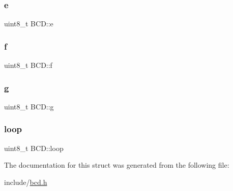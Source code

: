 \mbox{\label{structBCD_ac48c12d16a3111700c6a67f46db7ea1f}} 
\subsubsection{\texorpdfstring{e}{e}}
{\footnotesize\ttfamily uint8\+\_\+t B\+C\+D\+::e}

\mbox{\label{structBCD_abd6ad9ecd210b3f8d15a269526534a10}} 
\subsubsection{\texorpdfstring{f}{f}}
{\footnotesize\ttfamily uint8\+\_\+t B\+C\+D\+::f}

\mbox{\label{structBCD_a84dac73393cccf960f31340c034aee2e}} 
\subsubsection{\texorpdfstring{g}{g}}
{\footnotesize\ttfamily uint8\+\_\+t B\+C\+D\+::g}

\mbox{\label{structBCD_a6daf4f1f982e97a20852eedd79f4d619}} 
\subsubsection{\texorpdfstring{loop}{loop}}
{\footnotesize\ttfamily uint8\+\_\+t B\+C\+D\+::loop}



The documentation for this struct was generated from the following file\+:\begin{DoxyCompactItemize}
\item 
include/\mbox{\hyperlink{bcd_8h}{bcd.\+h}}\end{DoxyCompactItemize}
